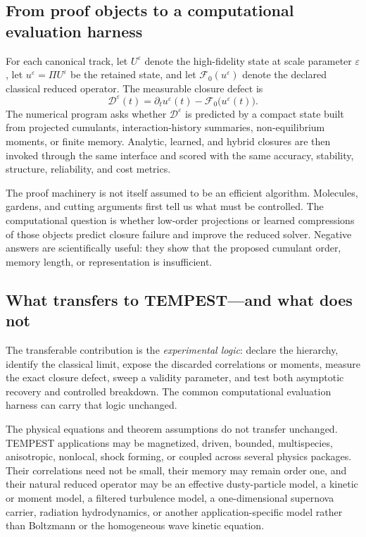 \documentclass[11pt]{article}
\begin{document}
\subsection{From proof objects to a computational evaluation harness}

For each canonical track, let $U^\varepsilon$ denote the high-fidelity state at scale parameter $\varepsilon$, let $u^\varepsilon=\Pi U^\varepsilon$ be the retained state, and let $\mathcal F_0(u^\varepsilon)$ denote the declared classical reduced operator. The measurable closure defect is
\begin{equation}
\mathcal D^\varepsilon(t)
=
\partial_t u^\varepsilon(t)-\mathcal F_0\bigl(u^\varepsilon(t)\bigr).
\end{equation}
The numerical program asks whether $\mathcal D^\varepsilon$ is predicted by a compact state built from projected cumulants, interaction-history summaries, non-equilibrium moments, or finite memory. Analytic, learned, and hybrid closures are then invoked through the same interface and scored with the same accuracy, stability, structure, reliability, and cost metrics.

The proof machinery is not itself assumed to be an efficient algorithm. Molecules, gardens, and cutting arguments first tell us what must be controlled. The computational question is whether low-order projections or learned compressions of those objects predict closure failure and improve the reduced solver. Negative answers are scientifically useful: they show that the proposed cumulant order, memory length, or representation is insufficient.

\subsection{What transfers to TEMPEST---and what does not}

The transferable contribution is the \emph{experimental logic}: declare the hierarchy, identify the classical limit, expose the discarded correlations or moments, measure the exact closure defect, sweep a validity parameter, and test both asymptotic recovery and controlled breakdown. The common computational evaluation harness can carry that logic unchanged.

The physical equations and theorem assumptions do not transfer unchanged. TEMPEST applications may be magnetized, driven, bounded, multispecies, anisotropic, nonlocal, shock forming, or coupled across several physics packages. Their correlations need not be small, their memory may remain order one, and their natural reduced operator may be an effective dusty-particle model, a kinetic or moment model, a filtered turbulence model, a one-dimensional supernova carrier, radiation hydrodynamics, or another application-specific model rather than Boltzmann or the homogeneous wave kinetic equation.
\end{document}
